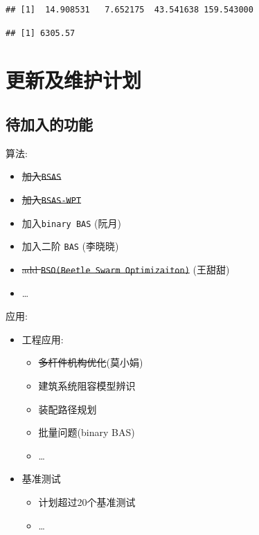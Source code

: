 \documentclass[]{ctexbook}
\newenvironment{Shaded}{\begin{snugshade}}{\end{snugshade}}
\newcommand{\OperatorTok}[1]{\textcolor[rgb]{0.81,0.36,0.00}{\textbf{#1}}}
\newcommand{\NormalTok}[1]{#1}
\providecommand{\tightlist}{%
  \setlength{\itemsep}{0pt}\setlength{\parskip}{0pt}}
\theoremstyle{definition}
\theoremstyle{definition}
\theoremstyle{definition}
\theoremstyle{remark}
\begin{document}
\begin{verbatim}
## [1]  14.908531   7.652175  43.541638 159.543000
\end{verbatim}

\begin{Shaded}
\end{Shaded}

\begin{verbatim}
## [1] 6305.57
\end{verbatim}

\chapter{更新及维护计划}\label{updates}

\section{待加入的功能}

算法:

\begin{itemize}
\tightlist
\item
  \sout{加入\texttt{BSAS}}
\item
  \sout{加入\texttt{BSAS-WPT}}
\item
  加入\texttt{binary\ BAS} (阮月)
\item
  加入二阶 \texttt{BAS} (李晓晓)
\item
  \sout{add \texttt{BSO(Beetle\ Swarm\ Optimizaiton)}} (王甜甜)
\item
  \ldots{}
\end{itemize}

应用:

\begin{itemize}
\tightlist
\item
  工程应用:

  \begin{itemize}
  \tightlist
  \item
    \sout{多杆件机构优化}(莫小娟)
  \item
    建筑系统阻容模型辨识
  \item
    装配路径规划
  \item
    批量问题(binary BAS)
  \item
    \ldots{}
  \end{itemize}
\item
  基准测试

  \begin{itemize}
  \tightlist
  \item
    计划超过20个基准测试
  \item
    \ldots{}
  \end{itemize}
\end{itemize}
\end{document}
